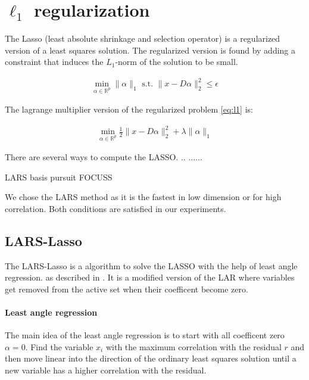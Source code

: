 \section {$\ell_1$ regularization}



The Lasso (least absolute shrinkage and selection operator) is a
regularized version of a least squares solution. The regularized version is
found by adding a constraint that induces the $L_1$-norm of the solution to be
small.\cite{Tibshirani1996}

\begin{align}
\min_{\alpha\in\mathbb{R}^{p}}   \lVert \alpha \rVert_{1}   \textrm{ s.t. } \lVert x - D\alpha \rVert^{2}_{2} \leq \epsilon\label{eq:l1}
\end{align}

The lagrange multiplier version of the regularized problem \ref{eq:l1} is:

\begin{align}
\min_{\alpha\in\mathbb{R}^{p}}  \frac{1}{2} \lVert x - D\alpha \rVert^{2}_{2} + \lambda \lVert \alpha \rVert_{1}
\end{align}

There are several ways to compute the LASSO. .. ...... 

LARS \cite{lars} basis pursuit\cite{BASIS_PURSUIT}  FOCUSS \cite{FOCUSS}

We chose the LARS method as it is the fastest in low dimension or for
high correlation. Both conditions are satisfied in our experiments. 


\subsection {LARS-Lasso}
\label{sec:lars}
The LARS-Lasso is a algorithm to solve the LASSO with the help of least
angle regression. as described in \cite{Efron2004}. It is a modified version of
the LAR where variables get removed from the active set when their coefficent
become zero.

\paragraph{Least angle regression}
The main idea of the least angle regression is to start with all coefficent zero
$\alpha = 0$. Find the variable $x_i$ with the maximum correlation with the
residual $r$ and then move linear into the direction of the ordinary least
squares solution until a new variable has a higher correlation with the
residual. 


